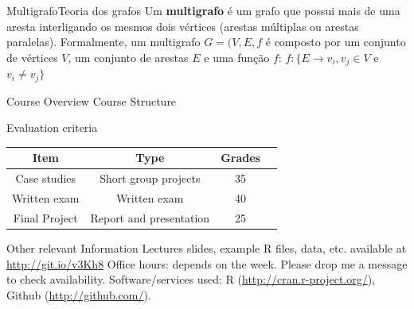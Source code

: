 \documentclass[t]{beamer}
\begin{document}

\begin{ftst}{Multigrafo}{Teoria dos grafos}
\justifying
Um \textbf{multigrafo} é um grafo que possui mais de uma aresta interligando os mesmos dois vértices (arestas múltiplas ou arestas paralelas). 
\vone
Formalmente, um multigrafo $G = (V,E,f$ é composto por um conjunto de vértices $V$, um conjunto de arestas $E$ e uma função $f$:
\vone
\vone
\vone
\centering
\huge
$f: \{E \rightarrow v_i, v_j \in V$ e $v_i \neq v_j \}$



\end{ftst}


\begin{ftst}
{Course Overview}
{Course Structure}
\begin{block}{Evaluation criteria}
	\begin{center}
		\small
		\begin{tabular}{cccc} \hline
			\textbf{Item}	& \textbf{Type}	&\textbf{Grades}\\
			\hline
			Case studies		& Short group projects		&35\\
			Written exam		& Written exam	&40\\
			Final Project		& Report and presentation		&25\\
			\hline
		\end{tabular}
	\end{center}
\end{block}

\begin{block}{Other relevant Information}
	\bitems Lectures slides, example R files, data, etc. available at \\
	{\small \url{http://git.io/v3Kh8}}
	\spitem Office hours: depends on the week. Please drop me a message to check availability.
	\spitem Software/services used: R ({\scriptsize\url{http://cran.r-project.org/}}),\\Github ({\scriptsize\url{http://github.com/}}).
	\eitem
\end{block}
\end{ftst}

\end{document}
